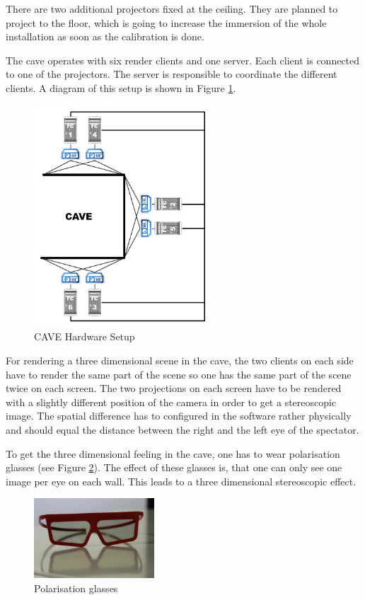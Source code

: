 There are two additional projectors fixed at the ceiling. They are planned to project to the floor, which is going to increase the immersion of the whole installation as soon as the calibration is done.

The \gls{cave} operates with six render clients and one server. Each client is connected to one of the projectors. The server is responsible to coordinate the different clients. A diagram of this setup is shown in Figure \ref{fig:cave_diagram}.

\begin{figure}[H]
	\centering
	\includegraphics[width=0.6\textwidth]{../figures/6node_architecture}
	\caption{CAVE Hardware Setup}
	\label{fig:cave_diagram}
\end{figure}

For rendering a three dimensional scene in the \gls{cave}, the two clients on each side have to render the same part of the scene so one has the same part of the scene twice on each screen. 
The two projections on each screen have to be rendered with a slightly different position of the camera in order to get a stereoscopic image. The spatial difference has to configured in the software rather physically and should equal the distance between the right and the left eye of the spectator.

To get the three dimensional feeling in the \gls{cave}, one has to wear polarisation glasses (see Figure \ref{fig:glasses}). The effect of these glasses is, that one can only see one image per eye on each wall. This leads to a three dimensional stereoscopic effect.

\begin{figure}[H]
	\centering
	\includegraphics[width=0.4\textwidth]{../figures/fotos/glasses}
	\caption{Polarisation glasses}
	\label{fig:glasses}
\end{figure}

